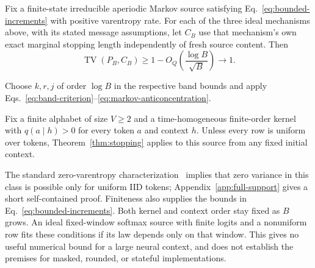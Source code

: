 \begin{theorem}
\label{thm:stopping}
Fix a finite-state irreducible aperiodic Markov source satisfying
Eq.~\eqref{eq:bounded-increments} with positive varentropy rate. For each of
the three ideal mechanisms above, with its stated message assumptions, let
$C_B$ use that mechanism's own exact marginal stopping length independently
of fresh source content. Then
\begin{equation}
 \operatorname{TV}(P_B,C_B)\ge
 1-O_Q\!\left(\frac{\log B}{\sqrt B}\right)\longrightarrow1.
\end{equation}
\end{theorem}

Choose $k,r,j$ of order $\log B$ in the respective band bounds and apply
Eqs.~\eqref{eq:band-criterion}--\eqref{eq:markov-anticoncentration}.

\begin{corollary}
\label{cor:full-support}
Fix a finite alphabet of size $V\ge2$ and a time-homogeneous finite-order
kernel with $q(a\mid h)>0$ for every token $a$ and context $h$. Unless every
row is uniform over tokens, Theorem~\ref{thm:stopping} applies to this source
from any fixed initial context.
\end{corollary}

The standard zero-varentropy characterization~\cite{kontoyiannis1998recurrence}
implies that zero variance in this class is possible only for uniform IID
tokens; Appendix~\ref{app:full-support} gives a short self-contained proof.
Finiteness also supplies the bounds in Eq.~\eqref{eq:bounded-increments}.
Both kernel and context order stay fixed as $B$ grows. An ideal fixed-window
softmax source with finite logits and a nonuniform row fits these conditions
if its law depends only on that window. This gives no useful numerical bound
for a large neural context, and does not establish the premises for masked,
rounded, or stateful implementations.

